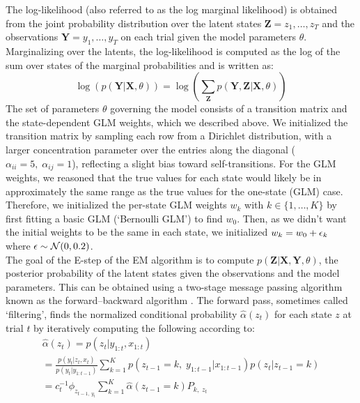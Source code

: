 The log-likelihood (also referred to as the log marginal likelihood) is obtained from the joint probability distribution over the latent states ${{{\mathbf{Z}}}} = z_1, \ldots ,z_T$ and the observations ${{{\mathbf{Y}}}} = y_1, \ldots ,y_T$
 on each trial given the model parameters $\theta$. Marginalizing over the latents, the log-likelihood is computed as the log of the sum over states of the marginal probabilities and is written as:
\begin{equation}
\label{eq:m9}
    \log \left( {p\left( {{{{\mathbf{Y}}}}|{{{\mathbf{X}}}},\theta } \right)} \right) = \log \left( {\mathop {\sum}\limits_{{{\mathbf{Z}}}} {p({{{\mathbf{Y}}}},{{{\mathbf{Z}}}}|{{{\mathbf{X}}}},\theta )} } \right)
\end{equation}
The set of parameters $\theta$ governing the model consists of a transition matrix and the state-dependent GLM weights, which we described above. We initialized the transition matrix by sampling each row from a Dirichlet distribution, with a larger concentration parameter over the entries along the diagonal ($\alpha _{ii} = 5,\;\alpha _{ij} = 1$), reflecting a slight bias toward self-transitions. For the GLM weights, we reasoned that the true values for each state would likely be in approximately the same range as the true values for the one-state (GLM) case. Therefore, we initialized the per-state GLM weights $w_k$ with $k \in \{ 1, \ldots ,K\}$ by first fitting a basic GLM (‘Bernoulli GLM’) to find $w_0$. Then, as we didn’t want the initial weights to be the same in each state, we initialized $w_k = w_0 + {\it{\epsilon }}_k$ where ${\it{\epsilon }}\sim {{{\mathcal{N}}}}(0,0.2)$. \\
The goal of the E-step of the EM algorithm is to compute $p({{{\mathbf{Z}}}}|{{{\mathbf{X}}}},{{{\mathbf{Y}}}},\theta )$, the posterior probability of the latent states given the observations and the model parameters. This can be obtained using a two-stage message passing algorithm known as the forward–backward algorithm \cite{escola_hidden_2011}. The forward pass, sometimes called ‘filtering’, finds the normalized conditional probability $\hat \alpha (z_t)$ for each state $z$ at trial $t$ by iteratively computing the following according to:  
\begin{equation}
\label{eq:m10}
    \begin{array}{c}\hat \alpha (z_t) = p(z_t|y_{1:t},x_{1:t})\\ = \frac{{p(y_t|z_t,x_t)}}{{p(y_t|y_{1:t - 1})}}\mathop {\sum }\limits_{k = 1}^K p\left( {z_{t - 1} = k,\;y_{1:t - 1}{{{\mathrm{|}}}}x_{1:t - 1}} \right)p(z_t|z_{t - 1} = k)\\ = c_t^{ - 1}\phi _{z_{t - 1,\;y_t}}\mathop {\sum }\limits_{k = 1}^K \hat \alpha \left( {z_{t - 1} = k} \right)P_{k,\;z_t}\end{array}
\end{equation}
